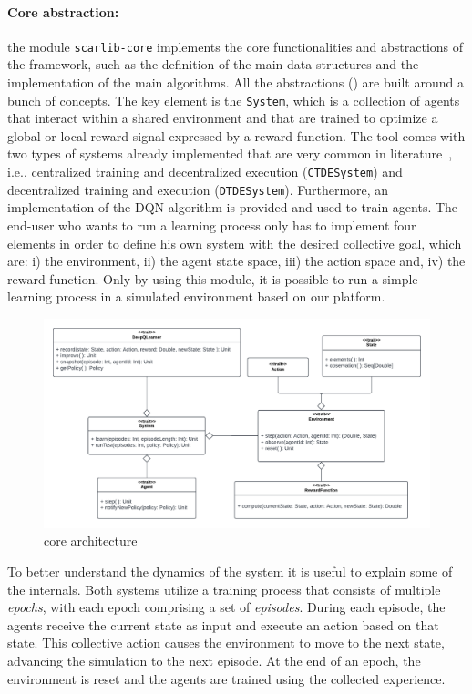 \paragraph{Core abstraction:} the module \texttt{scarlib-core} implements the core functionalities and abstractions of the framework, such as the definition of the main data structures and the implementation of the main algorithms. 
%
All the abstractions () are built around a bunch of concepts. The key element is the \texttt{System}, which is a collection of agents that interact within a shared environment and that are trained to optimize a global or local reward signal
expressed by a reward function. 
%
The tool comes with two types of systems already implemented that are very common in literature~\cite{Du2020},
i.e., centralized training and decentralized execution (\texttt{CTDESystem}) and decentralized training and execution (\texttt{DTDESystem}).
Furthermore, an implementation of the DQN algorithm \cite{Mnih2015} is provided and used to train agents. 
The end-user who wants to run a learning process only has to implement four elements
in order to define his own system with the desired collective goal, which are: 
 i) the environment, 
 ii) the agent state space, 
 iii) the action space and,
 iv) the reward function.
Only by using this module, 
 it is possible to run a simple learning process in a simulated environment based on our platform.

\begin{figure}[t]
    \centering
    \includegraphics[width=\textwidth]{papers/coordination2023/imgs/core-architecture.pdf}
    \caption{\scarlib{} core architecture}
    \label{fig:arc}
\end{figure} %

To better understand the dynamics of the system it is useful to explain some of the internals.
%
Both systems utilize a training process that consists of multiple \emph{epochs}, 
 with each epoch comprising a set of \emph{episodes}. 
 During each episode, 
 the agents receive the current state as input and 
 execute an action based on that state. 
This collective action causes 
 the environment to move to the next state, 
 advancing the simulation to the next episode.
At the end of an epoch, 
 the environment is reset and the agents are trained using the collected experience.

